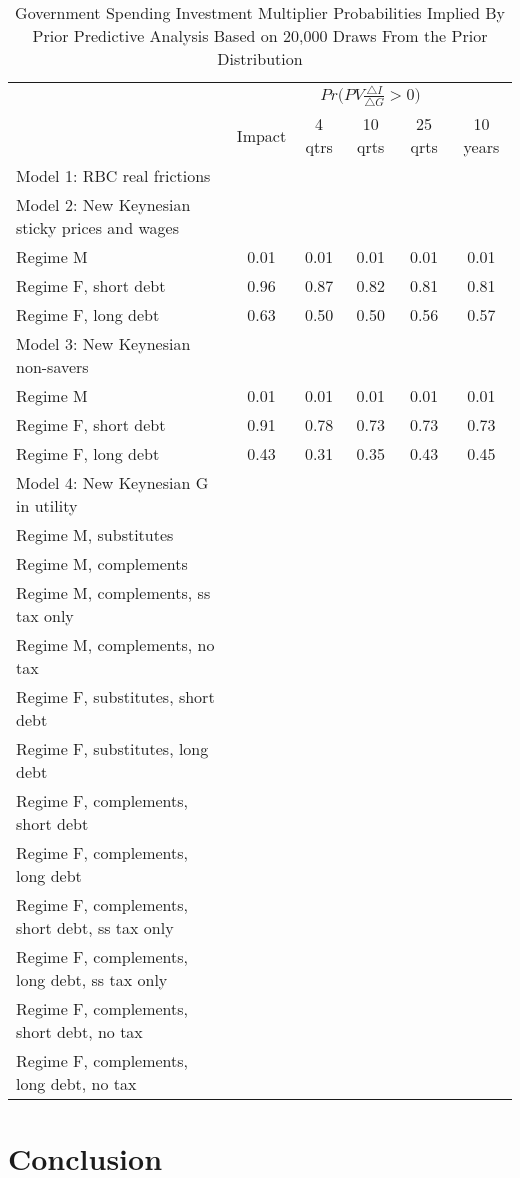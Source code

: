 \documentclass[letterpaper,12pt]{article}%
\begin{document}
\begin{table}[H]
    \centering
    \caption{Government Spending Investment Multiplier Probabilities Implied By Prior Predictive Analysis Based on 20,000 Draws From the Prior Distribution}
    \begin{tabular}{l c c c c c}
    \toprule
        & \multicolumn{5}{c}{$Pr\Big(PV \frac{\triangle I}{\triangle G}>0\Big)$}\\
        \cmidrule{2-6}
        & Impact & 4 qtrs & 10 qrts & 25 qrts & 10 years \\
        \midrule
     Model 1: RBC real frictions &    &   &   &   &  \\
     Model 2: New Keynesian sticky prices and wages   &    &   &   &   &   \\
     \quad Regime M &  0.01 &  0.01 & 0.01  & 0.01 &  0.01 \\
     \quad Regime F, short debt &   0.96 &  0.87 & 0.82 & 0.81  & 0.81 \\
     \quad Regime F, long debt &  0.63 & 0.50 & 0.50 & 0.56 & 0.57  \\
     Model 3: New Keynesian non-savers &    &   &   &   &  \\
     \quad Regime M &  0.01 &  0.01 & 0.01 & 0.01  & 0.01 \\
     \quad Regime F, short debt &  0.91 & 0.78 & 0.73 & 0.73 & 0.73  \\
     \quad Regime F, long debt &   0.43  &  0.31 & 0.35 & 0.43  & 0.45 \\
     Model 4: New Keynesian G in utility &    &   &   &   &  \\
     \quad Regime M, substitutes &    &   &   &   &  \\
     \quad Regime M, complements &    &   &   &   &  \\
     \quad Regime M, complements, ss tax only &    &   &   &   &  \\
     \quad Regime M, complements, no tax &    &   &   &   &  \\
     \quad Regime F, substitutes, short debt &    &   &   &   &  \\
     \quad Regime F, substitutes, long debt &    &   &   &   &  \\
     \quad Regime F, complements, short debt &    &   &   &   &  \\
     \quad Regime F, complements, long debt &    &   &   &   &  \\
     \quad Regime F, complements, short debt, ss tax only &    &   &   &   &  \\
     \quad Regime F, complements, long debt, ss tax only &    &   &   &   &  \\
     \quad Regime F, complements, short debt, no tax &    &   &   &   &  \\
     \quad Regime F, complements, long debt, no tax &    &   &   &   &  \\
    \bottomrule    
    \end{tabular}
    \label{tab:my_label}
\end{table}


\section{Conclusion}
\end{document}
